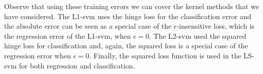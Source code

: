 Observe that using these training errors we can cover the kernel methods that we have considered. The L1-\acrshort{svm} uses the hinge loss for the classification error and the absolute error can be seen as a special case of the $\epsilon$-insensitive loss, which is the regression error of the L1-\acrshort{svm}, when $\epsilon = 0$. The L2-\acrshort{svm} used the squared hinge loss for classification and, again, the squared loss is a special case of the regression error when $\epsilon=0$. Finally, the squared loss function is used in the LS-\acrshort{svm} for both regression and classification.

